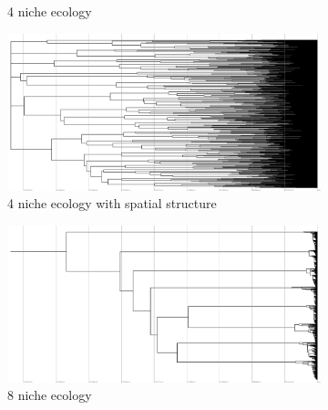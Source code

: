 \begin{figure}
\begin{subfigure}[b]{0.48\textwidth}
    \caption{%
      4 niche ecology}
  \end{subfigure}
  \hfill
  \begin{subfigure}[b]{0.48\textwidth}
    \includegraphics[height=0.12\textheight,width=\textwidth]{img/perfect-tree-phylogenies-log/epoch=7+resolution=3+treatment=22.pdf}
    \caption{%
      4 niche ecology with spatial structure}
  \end{subfigure}
  \hfill
  \begin{subfigure}[b]{0.48\textwidth}
    \includegraphics[height=0.12\textheight,width=\textwidth]{img/perfect-tree-phylogenies-log/epoch=7+resolution=3+treatment=20.pdf}
    \caption{%
      8 niche ecology}
  \end{subfigure}
  \hfill
  \begin{subfigure}[b]{0.48\textwidth}

\end{subfigure}
\end{figure}
